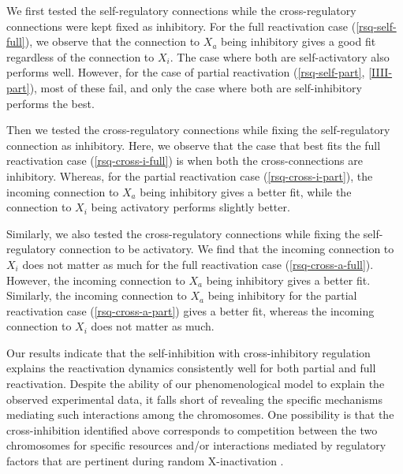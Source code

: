 \documentclass[11pt,a4paper]{article}
\renewcommand{\cite}{\parencite}
\begin{document}
We first tested the self-regulatory connections while the cross-regulatory connections were kept fixed as inhibitory. For the full reactivation case (\autoref{rsq-self-full}), we observe that the connection to $X_a$ being inhibitory gives a good fit regardless of the connection to $X_i$. The case where both are self-activatory also performs well. However, for the case of partial reactivation (\autoref{rsq-self-part}, \autoref{IIII-part}), most of these fail, and only the case where both are self-inhibitory performs the best.

Then we tested the cross-regulatory connections while fixing the self-regulatory connection as inhibitory. Here, we observe that the case that best fits the full reactivation case (\autoref{rsq-cross-i-full}) is when both the cross-connections are inhibitory. Whereas, for the partial reactivation case (\autoref{rsq-cross-i-part}), the incoming connection to  $X_a$ being inhibitory gives a better fit, while the connection to $X_i$ being activatory performs slightly better.

Similarly, we also tested the cross-regulatory connections while fixing the self-regulatory connection to be activatory. We find that the incoming connection to $X_i$ does not matter as much for the full reactivation case (\autoref{rsq-cross-a-full}). However, the incoming connection to $X_a$ being inhibitory gives a better fit. Similarly, the incoming connection to $X_a$ being inhibitory for the partial reactivation case (\autoref{rsq-cross-a-part}) gives a better fit, whereas the incoming connection to $X_i$ does not matter as much.


Our results indicate that the self-inhibition with cross-inhibitory regulation explains the reactivation dynamics consistently well for both partial and full reactivation. Despite the ability of our phenomenological model to explain the observed experimental data, it falls short of revealing the specific mechanisms mediating such interactions among the chromosomes. One possibility is that the cross-inhibition identified above corresponds to competition between the two chromosomes for specific resources and/or interactions mediated by regulatory factors that are pertinent during random X-inactivation \cite{XCI}.
\end{document}

